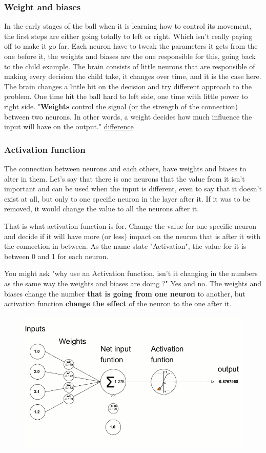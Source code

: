 \subsubsection{Weight and biases}

In the early stages of the ball when it is learning how to control its movement, the first steps are either going totally to left or right. Which isn't really paying off to make it go far. Each neuron have to tweak the parameters it gets from the one before it, the weights and biases are the one responsible for this, going back to the child example. The brain consists of little neurons that are responsible of making every decision the child take, it changes over time, and it is the case here. The brain changes a little bit on the decision and try different approach to the problem. One time hit the ball hard to left side, one time with little power to right side. "\textbf{Weights} control the signal (or the strength of the connection) between two neurons. In other words, a weight decides how much influence the input will have on the output." \href{https://machine-learning.paperspace.com/wiki/weights-and-biases}{difference}

\subsubsection{Activation function} \label{sec:activation-function}
The connection between neurons and each others, have weights and biases to alter in them. Let's say that there is one neurons that the value from it isn't important and can be used when the input is different, even to say that it doesn't exist at all, but only to one specific neuron in the layer after it. If it was to be removed, it would change the value to all the neurons after it.

That is what activation function is for. Change the value for one specific neuron and decide if it will have more (or less) impact on the neuron that is after it with the connection in between. As the name state "Activation", the value for it is between 0 and 1 for each neuron.

You might ask "why use an Activation function, isn't it changing in the numbers as the same way the weights and biases are doing ?" Yes and no. The weights and biases change the number \textbf{that is going from one neuron} to another, but activation function \textbf{change the effect} of the neuron to the one after it.

\begin{figure}[H]
	\centering
	\includegraphics[width=0.7\linewidth]{usedImages/neuronsNN}
	\caption{}
	\label{fig:neuronsnn}
\end{figure}


